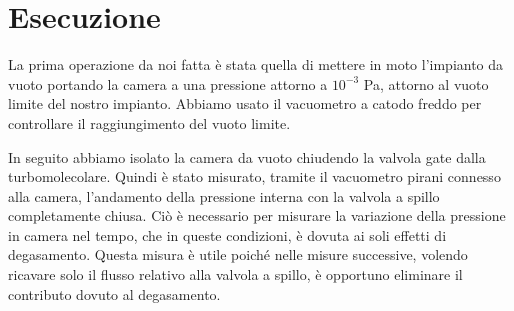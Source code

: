 \section{Esecuzione}

La prima operazione da noi fatta è stata quella di mettere in moto l'impianto da vuoto portando la camera a una pressione attorno a $10^{-3}$ \si{\pascal}, attorno al vuoto limite del nostro impianto. Abbiamo usato il vacuometro a catodo freddo per controllare il raggiungimento del vuoto limite.

In seguito abbiamo isolato la camera da vuoto chiudendo la valvola gate dalla turbomolecolare. Quindi è stato misurato, tramite il vacuometro pirani connesso alla camera, l'andamento della pressione interna con la valvola a spillo completamente chiusa. Ciò è necessario per misurare la variazione della pressione in camera nel tempo, che in queste condizioni, è dovuta ai soli effetti di degasamento. Questa misura è utile poiché nelle misure successive, volendo ricavare solo il flusso relativo alla valvola a spillo, è opportuno eliminare il contributo dovuto al degasamento. 

